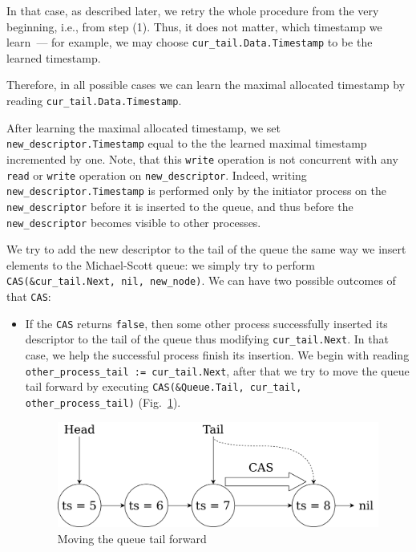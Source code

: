 \documentclass[times, dvipsnames,%
               languages={russian,english} %
              ]{itmo-student-thesis}
\begin{document}
\begin{nenum}
\begin{itemize}
        In that case, as described later, we retry the whole procedure from the very beginning, i.e., from step (1). Thus, it does not matter, which timestamp we learn~--- for example, we may choose \texttt{cur\_tail.Data.Timestamp} to be the learned timestamp.
    \end{itemize}
    
    \bigbreak
    
    Therefore, in all possible cases we can learn the maximal allocated timestamp by reading \texttt{cur\_tail.Data.Timestamp}.
    
    \item After learning the maximal allocated timestamp, we set \texttt{new\_descriptor.Timestamp} equal to the the learned maximal timestamp incremented by one. Note, that this \texttt{write} operation is not concurrent with any \texttt{read} or \texttt{write} operation on \texttt{new\_descriptor}. Indeed, writing \texttt{new\_descriptor.Timestamp} is performed only by the initiator process on the \texttt{new\_descriptor} before it is inserted to the queue, and thus before the \texttt{new\_descriptor} becomes visible to other processes.
    
    \item We try to add the new descriptor to the tail of the queue the same way we insert elements to the Michael-Scott queue: we simply try to perform \texttt{CAS(\&cur\_tail.Next, nil, new\_node)}. We can have two possible outcomes of that \texttt{CAS}:
    
    \begin{itemize}
        \item If the \texttt{CAS} returns \texttt{false}, then some other process successfully inserted its descriptor to the tail of the queue thus modifying \texttt{cur\_tail.Next}. In that case, we help the successful process finish its insertion. We begin with reading \texttt{other\_process\_tail := cur\_tail.Next}, after that we try to move the queue tail forward by executing \texttt{CAS(\&Queue.Tail, cur\_tail, other\_process\_tail)} (Fig.~\ref{queue-move-tail-pic}). 
        
        \begin{figure}[H]
          \centering
          \caption{Moving the queue tail forward}
          \label{queue-move-tail-pic}
          \includegraphics[width=\linewidth]{pics/queue-move-tail.png}
        \end{figure}
        

\end{itemize}
\end{nenum}
\end{document}
